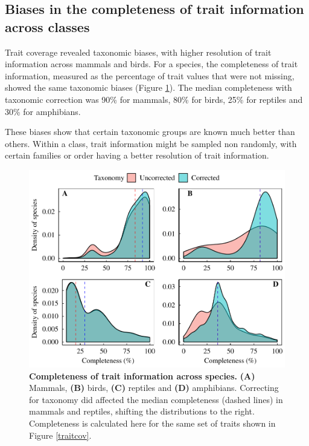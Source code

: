 \subsection{Biases in the completeness of trait information across classes}
Trait coverage revealed taxonomic biases, with higher resolution of trait information across mammals and birds. For a species, the completeness of trait information, measured as the percentage of trait values that were not missing, showed the same taxonomic biases (Figure \ref{traitcomp}). The median completeness with taxonomic correction was 90\% for mammals, 80\% for birds, 25\% for reptiles and 30\% for amphibians.

These biases show that certain taxonomic groups are known much better than others. Within a class, trait information might be sampled non randomly, with certain families or order having a better resolution of trait information. 

\begin{figure}[h!]
\centering
\includegraphics[scale=0.70]{figures/chapter2/Trait_coverage/Missing_values/Traitcompleteness}
\caption[Completeness of trait information across species]{\textbf{Completeness of trait information across species.} \textbf{(A)} Mammals, \textbf{(B)} birds, \textbf{(C)} reptiles and \textbf{(D)} amphibians. Correcting for taxonomy did affected the median completeness (dashed lines) in mammals and reptiles, shifting the distributions to the right. Completeness is calculated here for the same set of traits shown in Figure \ref{traitcov}.}
\label{traitcomp}
\end{figure}



